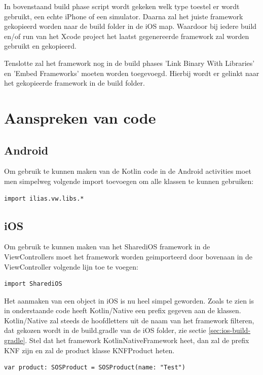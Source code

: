 In bovenstaand build phase script wordt gekeken welk type toestel er wordt gebruikt, een echte iPhone of een simulator. Daarna zal het juiste framework gekopieerd worden naar de build folder in de iOS map. Waardoor bij iedere build en/of run van het Xcode project het laatst gegenereerde framework zal worden gebruikt en gekopieerd.

Tenslotte zal het framework nog in de build phases 'Link Binary With Libraries' en 'Embed Frameworks' moeten worden toegevoegd. Hierbij wordt er gelinkt naar het gekopieerde framework in de build folder.

\section{Aanspreken van code}
\subsection{Android}
Om gebruik te kunnen maken van de Kotlin code in de Android activities moet men simpelweg volgende import toevoegen om alle klassen te kunnen gebruiken: 

\begin{lstlisting}
import ilias.vw.libs.*
\end{lstlisting}

\subsection{iOS}
Om gebruik te kunnen maken van het SharediOS framework in de ViewControllers moet het framework worden geimporteerd door bovenaan in de ViewController volgende lijn toe te voegen:

\begin{lstlisting}
import SharediOS
\end{lstlisting}

Het aanmaken van een object in iOS is nu heel simpel geworden. Zoals te zien is in onderstaande code heeft Kotlin/Native een prefix gegeven aan de klassen. Kotlin/Native zal steeds de hoofdletters uit de naam van het framework filteren, dat gekozen wordt in de build.gradle van de iOS folder, zie sectie \ref{sec:ios-build-gradle}. Stel dat het framework KotlinNativeFramework heet, dan zal de prefix KNF zijn en zal de product klasse KNFProduct heten.

\begin{lstlisting}
var product: SOSProduct = SOSProduct(name: "Test")
\end{lstlisting}

